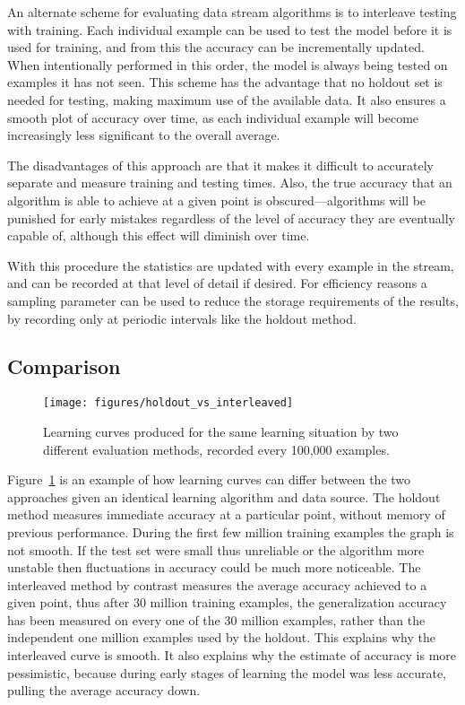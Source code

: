 An alternate scheme for evaluating data stream algorithms is to interleave testing with training. Each individual example can be used to test the model before it is used for training, and from this the accuracy can be incrementally updated. When intentionally performed in this order, the model is always being tested on examples it has not seen. This scheme has the advantage that no holdout set is needed for testing, making maximum use of the available data. It also ensures a smooth plot of accuracy over time, as each individual example will become increasingly less significant to the overall average.

The disadvantages of this approach are that it makes it difficult to accurately separate and measure training and testing times. Also, the true accuracy that an algorithm is able to achieve at a given point is obscured---algorithms will be punished for early mistakes regardless of the level of accuracy they are eventually capable of, although this effect will diminish over time.

With this procedure the statistics are updated with every example in the stream, and can be recorded at that level of detail if desired. For efficiency reasons a sampling parameter can be used to reduce the storage requirements of the results, by recording only at periodic intervals like the holdout method.

\subsection{Comparison}

\begin{figure}
\texttt{[image: figures/holdout\_vs\_interleaved]}
\caption{Learning curves produced for the same learning situation by two different evaluation methods, recorded every 100,000 examples.}
\label{fig:holdout_vs_interleaved}
\end{figure}

Figure~\ref{fig:holdout_vs_interleaved} is an example of how learning curves can differ between the two approaches given an identical learning algorithm and data source. The holdout method measures immediate accuracy at a particular point, without memory of previous performance. During the first few million training examples the graph is not smooth. If the test set were small thus unreliable or the algorithm more unstable then fluctuations in accuracy could be much more noticeable. The interleaved method by contrast measures the average accuracy achieved to a given point, thus after 30 million training examples, the generalization accuracy has been measured on every one of the 30 million examples, rather than the independent one million examples used by the holdout. This explains why the interleaved curve is smooth. It also explains why the estimate of accuracy is more pessimistic, because during early stages of learning the model was less accurate, pulling the average accuracy down.

